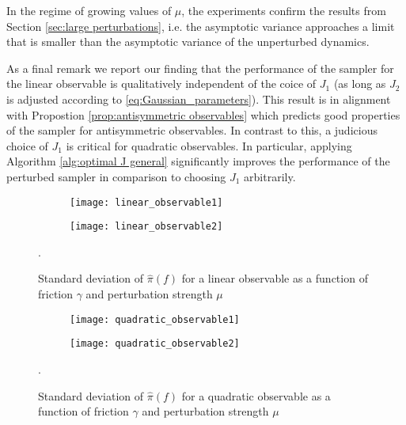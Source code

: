 In the regime of growing values of $\mu$, the experiments confirm the results from Section \ref{sec:large perturbations}, i.e. the asymptotic variance approaches a limit that is smaller than the asymptotic variance of the unperturbed dynamics.

As a final remark we report our finding that the performance of the sampler for the linear observable is qualitatively independent of the coice of $J_1$ (as long as $J_2$ is adjusted according to \eqref{eq:Gaussian_parameters}). This result is in alignment with Propostion \ref{prop:antisymmetric observables} which predicts good properties of the sampler for antisymmetric observables. In contrast to this, a judicious choice of $J_1$ is critical for quadratic observables. In particular, applying Algorithm \ref{alg:optimal J general} significantly improves the performance of the perturbed sampler in comparison to choosing $J_1$ arbitrarily.   
\begin{figure}
	\begin{subfigure}[b]{0.45 \textwidth}
		\texttt{[image: linear\_observable1]}
		\caption{}
		\label{fig:lin_1}
	\end{subfigure}
	\hfill
	\begin{subfigure}[b]{0.45 \textwidth}
		\texttt{[image: linear\_observable2]}
		\caption{}
		\label{fig:lin_2}
	\end{subfigure}
	.	\caption{Standard deviation of $\hat{\pi}(f)$ for a linear observable as
			a function of friction $\gamma$ and perturbation strength $\mu$}
	\label{fig:linear_observable}
\end{figure}

\begin{figure}
	\begin{subfigure}[b]{0.45 \textwidth}
		\texttt{[image: quadratic\_observable1]}
		\caption{}
		\label{fig:quad1}
	\end{subfigure}
	\hfill
	\begin{subfigure}[b]{0.45 \textwidth}
		\texttt{[image: quadratic\_observable2]}
		\caption{}
		\label{fig:quad2}
	\end{subfigure}
	.	\caption{Standard deviation of $\hat{\pi}(f)$ for a quadratic observable as
		a function of friction $\gamma$ and perturbation strength $\mu$}
	\label{fig:linear_observable}
\end{figure}